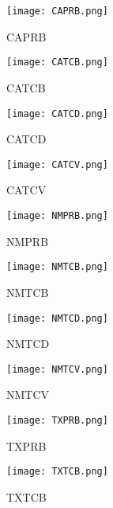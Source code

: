 \documentclass{mcmthesis}
\begin{document}
\begin{figure}[H]
\begin{minipage}[htb]{0.5\textwidth}
\centering
\texttt{[image: CAPRB.png]}
\caption{CAPRB} \label{fig:CAPRB}
\end{minipage}
\begin{minipage}[htb]{0.5\textwidth}
\centering
\texttt{[image: CATCB.png]}
\caption{CATCB} \label{fig:CATCB}
\end{minipage}
\end{figure}

\begin{figure}[H]
\begin{minipage}[htb]{0.5\textwidth}
\centering
\texttt{[image: CATCD.png]}
\caption{CATCD} \label{fig:CATCD}
\end{minipage}
\begin{minipage}[htb]{0.5\textwidth}
\centering
\texttt{[image: CATCV.png]}
\caption{CATCV} \label{fig:CATCV}
\end{minipage}
\end{figure}

\begin{figure}[H]
\begin{minipage}[htb]{0.5\textwidth}
\centering
\texttt{[image: NMPRB.png]}
\caption{NMPRB} \label{fig:NMPRB}
\end{minipage}
\begin{minipage}[htb]{0.5\textwidth}
\centering
\texttt{[image: NMTCB.png]}
\caption{NMTCB} \label{fig:NMTCB}
\end{minipage}
\end{figure}

\begin{figure}[H]
\begin{minipage}[htb]{0.5\textwidth}
\centering
\texttt{[image: NMTCD.png]}
\caption{NMTCD} \label{fig:NMTCD}
\end{minipage}
\begin{minipage}[htb]{0.5\textwidth}
\centering
\texttt{[image: NMTCV.png]}
\caption{NMTCV} \label{fig:NMTCV}
\end{minipage}
\end{figure}


\begin{figure}[H]
\begin{minipage}[htb]{0.5\textwidth}
\centering
\texttt{[image: TXPRB.png]}
\caption{TXPRB} \label{fig:TXPRB}
\end{minipage}
\begin{minipage}[htb]{0.5\textwidth}
\centering
\texttt{[image: TXTCB.png]}
\caption{TXTCB} \label{fig:TXTCB}
\end{minipage}
\end{figure}
\end{document}
